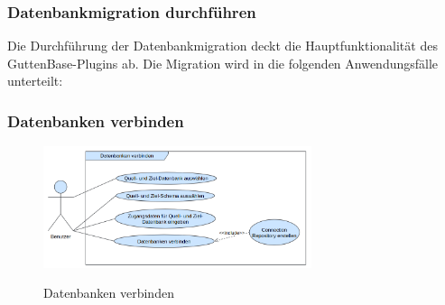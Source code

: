 \subsubsection{Datenbankmigration durchführen}
Die Durchführung der Datenbankmigration deckt die Hauptfunktionalität des GuttenBase-Plugins ab. Die Migration wird in die folgenden Anwendungsfälle unterteilt:
\subsubsection*{Datenbanken verbinden}
\begin{figure}[H]
	\caption{Datenbanken verbinden}
	\centering
	\includegraphics[width=0.7\textwidth]{images/af/af-db-verbinden}
	\label{img:af-db-verbinden}
\end{figure}

